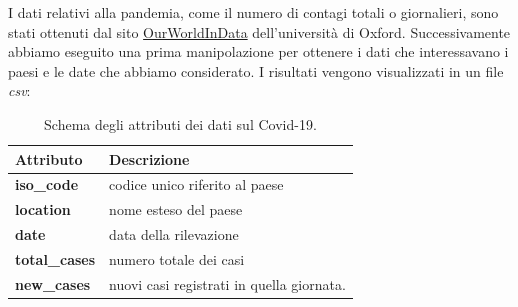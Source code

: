 I dati relativi alla pandemia, come il numero di contagi totali o giornalieri, sono stati ottenuti dal sito \href{https://ourworldindata.org/coronavirus-testing}{OurWorldInData} dell'università di Oxford. Successivamente abbiamo eseguito una prima manipolazione per ottenere i dati che interessavano i paesi e le date che abbiamo considerato. I risultati vengono visualizzati in un file \textit{csv}:
\begin{table}[H]
	\centering
	\begin{tabular}{l|l}
		\textbf{Attributo} & \textbf{Descrizione} \\
		\hline
		\textbf{iso\_code} & codice unico riferito al paese \\\hline
		\textbf{location} & nome esteso del paese\\\hline
		\textbf{date} & data della rilevazione\\\hline
		\textbf{total\_cases} & numero totale dei casi\\\hline
		\textbf{new\_cases} & nuovi casi registrati in quella giornata.\\\hline

	\end{tabular}
	\caption{Schema degli attributi dei dati sul Covid-19.}
\end{table}

